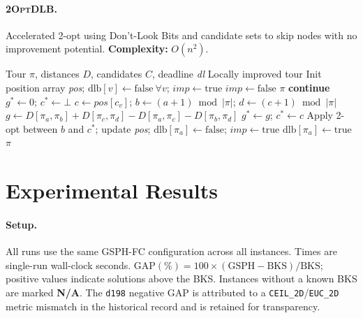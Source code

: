 \documentclass[runningheads]{llncs}
\begin{document}
\paragraph{\textsc{2OptDLB}.}
Accelerated 2-opt using Don't-Look Bits and candidate sets to skip
nodes with no improvement potential.
\textbf{Complexity:} $O(n^2)$.

\begin{algorithm}
\caption{\textsc{2OptDLB} — 2-opt with Don't-Look Bits and candidates}
\label{alg:dlb}
\begin{algorithmic}[1]
\Require Tour $\pi$, distances $D$, candidates $C$,
         deadline \textit{dl}
\Ensure  Locally improved tour
\State Init position array \textit{pos};\;
       $\text{dlb}[v]\gets\mathrm{false}\ \forall v$;\;
       $\textit{imp}\gets\mathrm{true}$
  \State $\textit{imp}\gets\mathrm{false}$
    \;\Return $\pi$\EndIf
    \;\textbf{continue}\EndIf
    \State $g^*\gets 0$;\; $c^*\gets\bot$
      \State $c\gets\textit{pos}[c_v]$;\;
             $b\gets(a+1)\bmod|\pi|$;\;
             $d\gets(c+1)\bmod|\pi|$
      \State $g\gets D[\pi_a,\pi_b]+D[\pi_c,\pi_d]
                   -D[\pi_a,\pi_c]-D[\pi_b,\pi_d]$
      \; $g^*\gets g$;\; $c^*\gets c$\EndIf
    \EndFor
      \State Apply 2-opt between $b$ and $c^*$;\;
             update \textit{pos};\;
             $\text{dlb}[\pi_a]\gets\mathrm{false}$;\;
             $\textit{imp}\gets\mathrm{true}$
    \Else\; $\text{dlb}[\pi_a]\gets\mathrm{true}$
    \EndIf
  \EndFor
\EndWhile
\State \Return $\pi$
\end{algorithmic}
\end{algorithm}

\section{Experimental Results}
\label{sec:experiments}

\paragraph{Setup.}
All runs use the same GSPH-FC configuration across all instances.
Times are single-run wall-clock seconds. GAP$(\%)=100\times
(\text{GSPH}-\text{BKS})/\text{BKS}$; positive values indicate
solutions above the BKS. Instances without a known BKS are marked
\textbf{N/A}. The \texttt{d198} negative GAP is attributed to a
\texttt{CEIL\_2D}/\texttt{EUC\_2D} metric mismatch in the historical
record and is retained for transparency.
\end{document}
